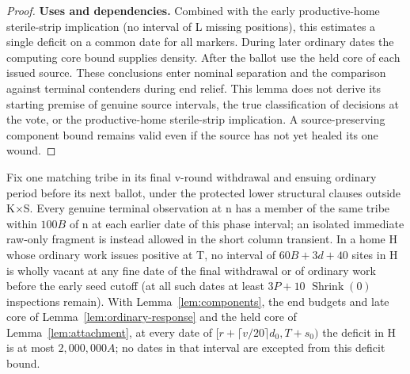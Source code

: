\begin{proof}
\textbf{Uses and dependencies.} Combined with the early productive-home sterile-strip implication (no interval of L missing positions), this estimates a single deficit on a common date for all markers. During later ordinary dates the computing core bound supplies density. After the ballot use the held core of each issued source. These conclusions enter nominal separation and the comparison against terminal contenders during end relief. This lemma does not derive its starting premise of genuine source intervals, the true classification of decisions at the vote, or the productive-home sterile-strip implication. A source-preserving component bound remains valid even if the source has not yet healed its one wound.
\end{proof}

\begin{lemma}\label{lem:thin-density}
Fix one matching tribe in its final v-round withdrawal and ensuing ordinary period before its next ballot, under the protected lower structural clauses outside K\(\times\)S. Every genuine terminal observation at n has a member of the same tribe within \(100B\) of n at each earlier date of this phase interval; an isolated immediate raw-only fragment is instead allowed in the short column transient. In a home H whose ordinary work issues positive at T, no interval of \(60B+3d+40\) sites in H is wholly vacant at any fine date of the final withdrawal or of ordinary work before the early seed cutoff (at all such dates at least \(3P+10\) \(\operatorname{Shrink}(0)\) inspections remain). With Lemma~\ref{lem:components}, the end budgets and late core of Lemma~\ref{lem:ordinary-response} and the held core of Lemma~\ref{lem:attachment}, at every date of \([r+\lceil v/20\rceil d_0,T+s_0)\) the deficit in H is at most \(2{,}000{,}000A\); no dates in that interval are excepted from this deficit bound.
\end{lemma}

